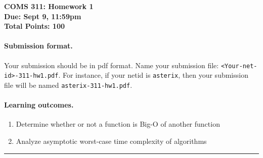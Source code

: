 \documentclass[11pt]{article}
\date{}
\begin{document}
    \begin{center}
        \textbf{COMS 311: Homework 1}\\
        \textbf{Due: Sept 9, 11:59pm}\\
        \textbf{Total Points: 100}
    \end{center}

    \paragraph{Submission format.\ }
    Your submission should be in pdf format. Name your submission file:
    \texttt{<Your-net-id>-311-hw1.pdf}. For instance, if your netid is
    \texttt{asterix}, then your submission file will be named
    \texttt{asterix-311-hw1.pdf}.

    \paragraph{Learning outcomes.\ }
    \begin{enumerate}
        \item Determine whether or not a function is Big-O of another function
        \item Analyze asymptotic worst-case time complexity of algorithms
    \end{enumerate}

    \hrule
\end{document}
